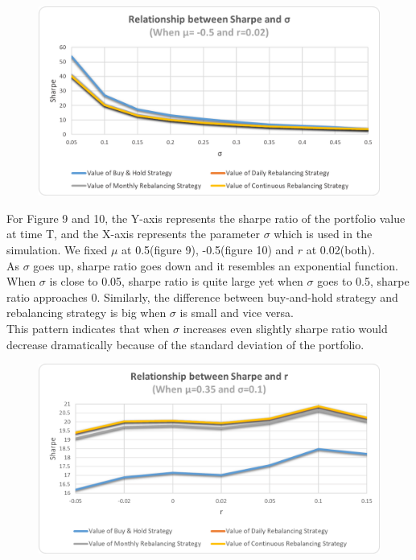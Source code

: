 \documentclass[
10pt, %
a4paper, %
oneside, %
headinclude,footinclude, %
BCOR5mm, %
]{scrartcl}
\begin{document}
\begin{figure}[H]
	\centering
	\includegraphics[width=0.7\linewidth]{sharpe_sigma_-050_002}
	\caption{}
	\label{fig:sharpesigma-050002}
\end{figure}
For Figure 9 and 10, the Y-axis represents the sharpe ratio of the portfolio value at time T, and the X-axis represents the parameter $\sigma$ which is used in the simulation. We fixed $\mu$ at 0.5(figure 9), -0.5(figure 10) and $r$ at 0.02(both).\\

As $\sigma$ goes up, sharpe ratio goes down and it resembles an exponential function. When $\sigma$ is close to 0.05, sharpe ratio is quite large yet when $\sigma$ goes to 0.5, sharpe ratio approaches 0. Similarly, the difference between buy-and-hold strategy and rebalancing strategy is big when $\sigma$ is small and vice versa.\\

This pattern indicates that when $\sigma$ increases even slightly sharpe ratio would decrease dramatically because of the standard deviation of the portfolio.\\

\begin{figure}[H]
	\centering
	\includegraphics[width=0.7\linewidth]{sharpe_r_035_010}
	\caption{}
	\label{fig:sharper035010}
\end{figure}
\end{document}
